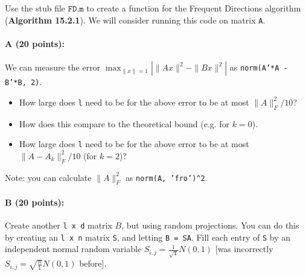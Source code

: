 \documentclass[11pt]{article}
\begin{document}
Use the stub file $\texttt{FD.m}$ to create a function for the Frequent Directions algorithm (\textbf{Algorithm 15.2.1}).  We will consider running this code on matrix \texttt{A}.  

\paragraph{A (20 points):}
We can measure the error $\max_{\|x\|=1} | \|A x\|^2 - \|B x\|^2 |$ as 
\texttt{norm(A'*A - B'*B, 2)}.  
\begin{itemize} \denselist
\item How large does \texttt{l} need to be for the above error to be at most $\|A\|_F^2 /10$?  
\item How does this compare to the theoretical bound (e.g. for $k=0$).  
\item How large does \texttt{l} need to be for the above error to be at most $\|A - A_k\|_F^2/10$ (for $k=2$)?
\end{itemize}

Note: you can calculate $\|A\|_F^2$ as \texttt{norm(A, 'fro')\^{}2}.  




\paragraph{B (20 points):}
Create another \texttt{l x d} matrix $B$, but using random projections.  You can do this by creating an \texttt{l x n} matrix \texttt{S}, and letting \texttt{B = SA}.  Fill each entry of \texttt{S} by an independent normal random variable {\color{red} $S_{i,j} = \frac{1}{\sqrt{\texttt{l}}} N(0,1)$}  {\color{blue} [was incorrectly $S_{i,j} = \sqrt{\frac{n}{\texttt{l}}} N(0,1)$ before]}.  
\end{document}
